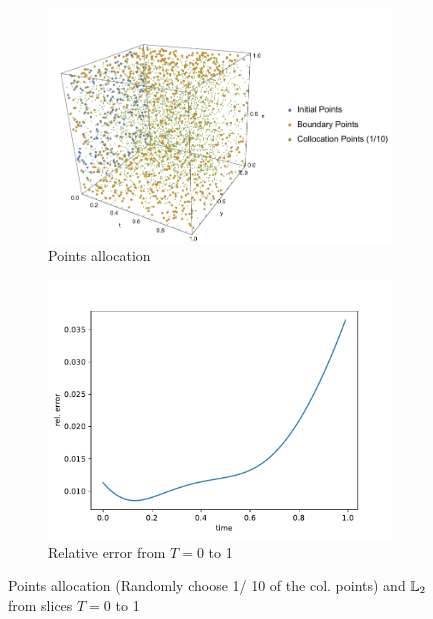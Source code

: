 \documentclass[11pt, a4paper]{article}
\begin{document}
    \begin{figure}[ht!]
        \centering
          \begin{subfigure}{0.55\textwidth}
            \centering   
            \includegraphics[width=1\linewidth]{./pics/pts.pdf}
              \caption{Points allocation}
              \label{fig:sub1}
          \end{subfigure}   %
          \begin{subfigure}{0.4\textwidth}
            \centering   
            \includegraphics[width=\linewidth]{./pics/rel_error_with_t.pdf}
              \caption{Relative error from $T=0$ to 1}
              \label{fig:relerrorwitht}
          \end{subfigure}
      \caption{
      \label{fig:total}
      Points allocation (Randomly choose 1/ 10 of the col. points) and $\mathbb{L}_2$ from slices $T=0$ to 1
      }
      \end{figure}
\end{document}
